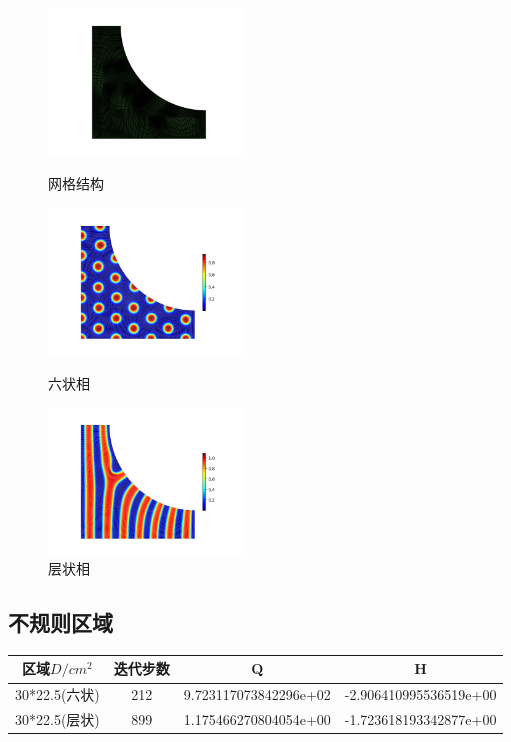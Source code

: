 \documentclass[12pt]{article}
\begin{document}
\begin{CJK}{UTF8}{gkai}
  \begin{figure}[H]
  	\setlength{\abovecaptionskip}{0.cm}
  	\setlength{\belowcaptionskip}{-0.cm}
  	\begin{minipage}[!htbp]{0.3\linewidth}
  		\includegraphics[width=5.2cm]{Figure_Lc.png}
  		\caption*{网格结构}
  	\end{minipage}
  	\hspace{0.23in}
  	\begin{minipage}[!htbp]{0.3\linewidth}
  		\includegraphics[width=5.2cm]{scftfigure9480.png}
  		\caption*{六状相}
  	\end{minipage}
  	\hspace{0.23in}
  	\begin{minipage}[!htbp]{0.3\linewidth}
  		\includegraphics[width=5.2cm]{scftfigure400.png}
  		\caption*{层状相}
  	\end{minipage}
  \end{figure}
  \subsection{不规则区域}   
  \begin{table}[H]
  		\centering
  	\begin{tabular}{cccc}
  		\toprule
  		区域$D/cm^2$ &	迭代步数 & Q &  H \\
  		\midrule
  		30*22.5(六状)&212& 9.723117073842296e+02 & -2.906410995536519e+00\\
  		30*22.5(层状)&899 &1.175466270804054e+00 & -1.723618193342877e+00\\
  		\bottomrule
  	\end{tabular}
  \end{table}
  

\end{CJK}
\end{document}

